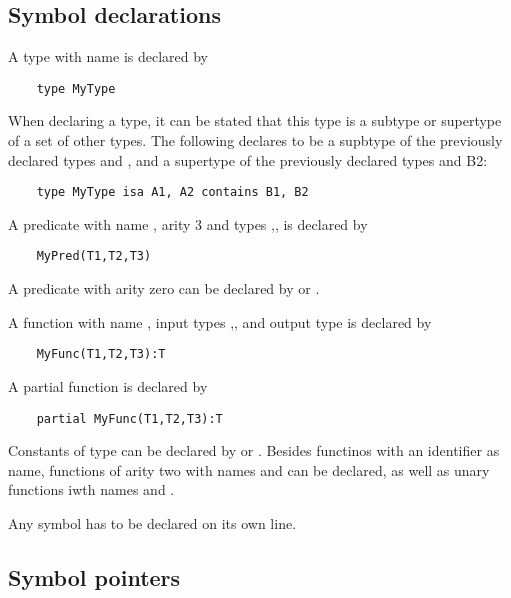 \documentclass[a4]{article}
\begin{document}
\subsection{Symbol declarations}
\label{ssec:symbols}
A type with name  is declared by
\begin{lstlisting}
	type MyType
\end{lstlisting}
When declaring a type, it can be stated that this type is a subtype or supertype of a set of other types.  The following declares  to be a supbtype of the previously declared types  and , and a supertype of the previously declared types  and {B2}:
\begin{lstlisting}
	type MyType isa A1, A2 contains B1, B2
\end{lstlisting}
A predicate with name , arity 3 and types ,, is declared by
\begin{lstlisting}
	MyPred(T1,T2,T3)
\end{lstlisting}

A predicate with arity zero can be declared by  or .

A function with name , input types ,, and output type   is declared by
\begin{lstlisting}
	MyFunc(T1,T2,T3):T
\end{lstlisting}

A partial function is declared by 
\begin{lstlisting}
	partial MyFunc(T1,T2,T3):T
\end{lstlisting}

Constants of type  can be declared by  or .  Besides functinos with an identifier as name, functions of arity two with names \code{+,-,*,/,\%}  and \code{\textasciicircum} can be declared, as well as unary functions iwth names \code{-} and .

Any symbol has to be declared on its own line.



\subsection{Symbol pointers}
\end{document}
